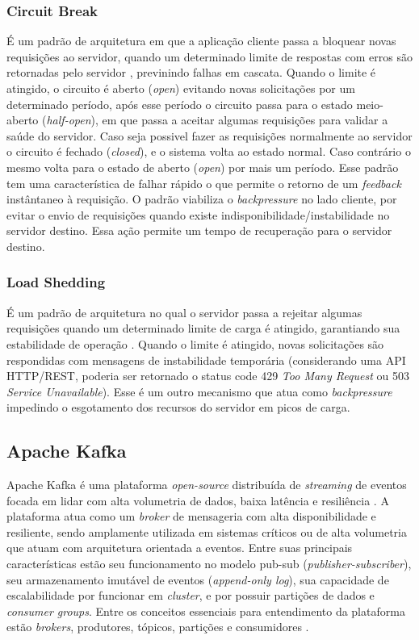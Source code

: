\documentclass[12pt]{article}
\begin{document}
  \subsubsection{Circuit Break}
  É um padrão de arquitetura em que a aplicação cliente passa a bloquear novas requisições ao servidor, quando um determinado limite de respostas com erros são retornadas pelo servidor \cite{newmanResilientds, bruceMicroservices2024}, previnindo falhas em cascata. Quando o limite é atingido, o circuito é aberto (\textit{open}) evitando novas solicitações por um determinado período, após esse período o circuito passa para o estado meio-aberto (\textit{half-open}), em que passa a aceitar algumas requisições para validar a saúde do servidor. Caso seja possivel fazer as requisições normalmente ao servidor o circuito é fechado (\textit{closed}), e o sistema volta ao estado normal. Caso contrário o mesmo volta para o estado de aberto (\textit{open}) por mais um período. Esse padrão tem uma característica de falhar rápido o que permite o retorno de um \textit{feedback} instântaneo à requisição. O padrão viabiliza o \textit{backpressure} no lado cliente, por evitar o envio de requisições quando existe indisponibilidade/instabilidade no servidor destino. Essa ação permite um tempo de recuperação para o servidor destino.

  \subsubsection{Load Shedding}
  É um padrão de arquitetura no qual o servidor passa a rejeitar algumas  requisições quando um determinado limite de carga é atingido, garantiando sua estabilidade de operação \cite{newmanResilientds}. Quando o limite é atingido, novas solicitações são respondidas com mensagens de instabilidade temporária (considerando uma API HTTP/REST, poderia ser retornado o status code 429 \textit{Too Many Request} ou 503 \textit{Service Unavailable}). Esse é um outro mecanismo que atua como \textit{backpressure} impedindo o esgotamento dos recursos do servidor em picos de carga.

  \subsection{Apache Kafka}
  Apache Kafka é uma plataforma \textit{open-source} distribuída de \textit{streaming} de eventos focada em lidar com alta volumetria de dados, baixa latência e resiliência \cite{apacheKafka2026Intro, gorshkova2026kafka}. A plataforma atua como um \textit{broker} de mensageria com alta disponibilidade e resiliente, sendo amplamente utilizada em sistemas críticos ou de alta volumetria que atuam com arquitetura orientada a eventos. Entre suas principais características estão seu funcionamento no modelo pub-sub (\textit{publisher-subscriber}), seu armazenamento imutável de eventos (\textit{append-only log}), sua capacidade de escalabilidade por funcionar em \textit{cluster}, e por possuir partições de dados e \textit{consumer groups}.  Entre os conceitos essenciais para entendimento da plataforma estão \textit{brokers}, produtores, tópicos, partições e consumidores \cite{confluenceKafka2026}.
\end{document}
